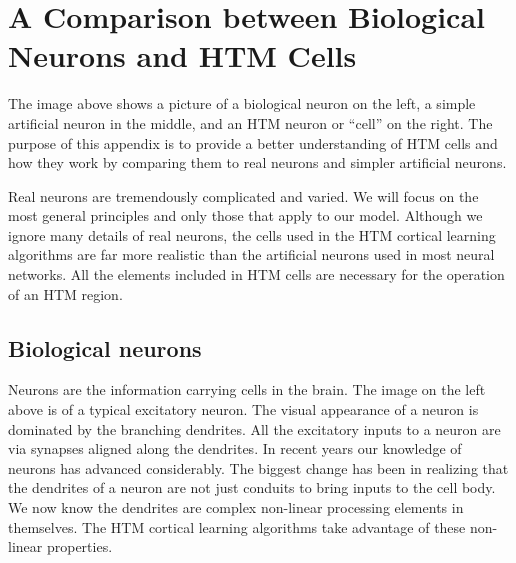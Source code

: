 \documentclass{report}
\begin{document}
\appendix

\chapter{A Comparison between Biological Neurons and HTM Cells}
\label{appendix:compare-neuron-cell}

\begin{figure}
\end{figure}

The image above shows a picture of a biological neuron on the left, a
simple artificial neuron in the middle, and an HTM neuron or ``cell''
on the right. The purpose of this appendix is to provide a better
understanding of HTM cells and how they work by comparing them to real
neurons and simpler artificial neurons.

Real neurons are tremendously complicated and varied. We will focus on
the most general principles and only those that apply to our
model. Although we ignore many details of real neurons, the cells used
in the HTM cortical learning algorithms are far more realistic than
the artificial neurons used in most neural networks. All the elements
included in HTM cells are necessary for the operation of an HTM
region.

\section*{Biological neurons}
Neurons are the information carrying cells in the brain. The image on
the left above is of a typical excitatory neuron. The visual
appearance of a neuron is dominated by the branching dendrites. All
the excitatory inputs to a neuron are via synapses aligned along the
dendrites. In recent years our knowledge of neurons has advanced
considerably. The biggest change has been in realizing that the
dendrites of a neuron are not just conduits to bring inputs to the
cell body. We now know the dendrites are complex non-linear processing
elements in themselves. The HTM cortical learning algorithms take
advantage of these non-linear properties.
\end{document}
